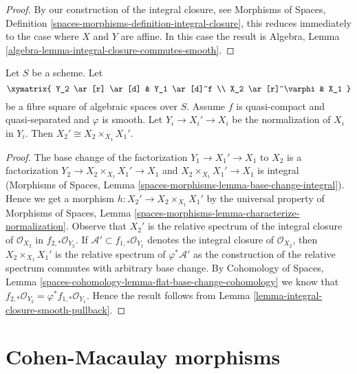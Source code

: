 \begin{proof}
By our construction of the integral closure, see
Morphisms of Spaces, Definition
\ref{spaces-morphisms-definition-integral-closure},
this reduces immediately to the case where $X$ and $Y$ are affine.
In this case the result is
Algebra, Lemma \ref{algebra-lemma-integral-closure-commutes-smooth}.
\end{proof}

\begin{lemma}
\label{lemma-normalization-smooth-localization}
Let $S$ be a scheme. Let
$$
\xymatrix{
Y_2 \ar[r] \ar[d] & Y_1 \ar[d]^f \\
X_2 \ar[r]^\varphi & X_1
}
$$
be a fibre square of algebraic spaces over $S$. Assume $f$ is quasi-compact
and quasi-separated and $\varphi$ is smooth.
Let $Y_i \to X_i' \to X_i$ be the normalization of $X_i$ in $Y_i$.
Then $X_2' \cong X_2 \times_{X_1} X_1'$.
\end{lemma}

\begin{proof}
The base change of the factorization $Y_1 \to X_1' \to X_1$ to $X_2$
is a factorization $Y_2 \to X_2 \times_{X_1} X_1' \to X_1$ and
$X_2 \times_{X_1} X_1' \to X_1$ is integral
(Morphisms of Spaces, Lemma \ref{spaces-morphisms-lemma-base-change-integral}).
Hence we get a morphism
$h : X_2' \to X_2 \times_{X_1} X_1'$ by the universal property of
Morphisms of Spaces, Lemma
\ref{spaces-morphisms-lemma-characterize-normalization}.
Observe that $X_2'$ is the relative spectrum of the integral closure
of $\mathcal{O}_{X_2}$ in $f_{2, *}\mathcal{O}_{Y_2}$.
If $\mathcal{A}' \subset f_{1, *}\mathcal{O}_{Y_1}$ denotes the integral
closure of $\mathcal{O}_{X_2}$, then $X_2 \times_{X_1} X_1'$ is the
relative spectrum of $\varphi^*\mathcal{A}'$ as the construction of
the relative spectrum commutes with arbitrary base change. By
Cohomology of Spaces, Lemma
\ref{spaces-cohomology-lemma-flat-base-change-cohomology}
we know that $f_{2, *}\mathcal{O}_{Y_2} = \varphi^*f_{1, *}\mathcal{O}_{Y_1}$.
Hence the result follows from
Lemma \ref{lemma-integral-closure-smooth-pullback}.
\end{proof}








\section{Cohen-Macaulay morphisms}
\label{section-CM}


